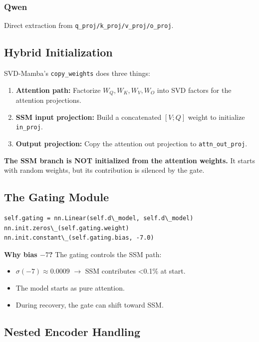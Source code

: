 \subsubsection{Qwen}

Direct extraction from \texttt{q\_proj/k\_proj/v\_proj/o\_proj}.

\subsection{Hybrid Initialization}

SVD-Mamba's \texttt{copy\_weights} does three things:

\begin{enumerate}
\item \textbf{Attention path:} Factorize $W_Q, W_K, W_V, W_O$ into SVD factors
  for the attention projections.
\item \textbf{SSM input projection:} Build a concatenated $[V; Q]$ weight to
  initialize \texttt{in\_proj}.
\item \textbf{Output projection:} Copy the attention out projection to \texttt{attn\_out\_proj}.

\end{enumerate}
\textbf{The SSM branch is NOT initialized from the attention weights.} It starts 
with random weights, but its contribution is silenced by the gate.

\subsection{The Gating Module}

\begin{lstlisting}
self.gating = nn.Linear(self.d\_model, self.d\_model)
nn.init.zeros\_(self.gating.weight)
nn.init.constant\_(self.gating.bias, -7.0)
\end{lstlisting}

\textbf{Why bias $-7$?} The gating controls the SSM path:

\begin{itemize}
\item $\sigma(-7) \approx 0.0009$ $\to$ SSM contributes \textless{}0.1\% at start.
\item The model starts as pure attention.
\item During recovery, the gate can shift toward SSM.

\end{itemize}
\subsection{Nested Encoder Handling}

